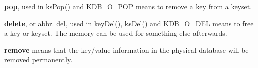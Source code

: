 \begin{DoxyItemize}
\item {\bfseries pop}, used in \hyperlink{group__keyset_gae42530b04defb772059de0600159cf69}{ks\-Pop()} and \hyperlink{group__keyset_KDB_O_POP}{K\-D\-B\-\_\-\-O\-\_\-\-P\-O\-P} means to remove a key from a keyset.
\item {\bfseries delete}, or abbr. del, used in \hyperlink{group__key_ga3df95bbc2494e3e6703ece5639be5bb1}{key\-Del()}, \hyperlink{group__keyset_ga27e5c16473b02a422238c8d970db7ac8}{ks\-Del()} and \hyperlink{group__keyset_gga98a3d6a4016c9dad9cbd1a99a9c2a45aa66a5380c120f25f28f49848c4a863ead}{K\-D\-B\-\_\-\-O\-\_\-\-D\-E\-L} means to free a key or keyset. The memory can be used for something else afterwards.
\item {\bfseries remove} means that the key/value information in the physical database will be removed permanently. 
\end{DoxyItemize}